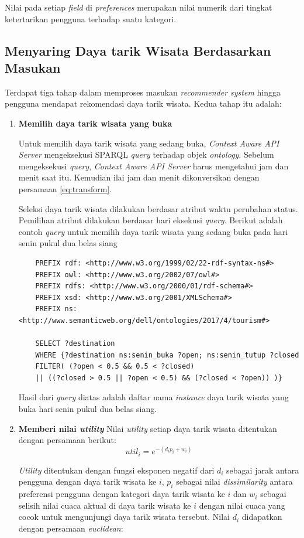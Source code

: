 Nilai pada setiap \textit{field} di \textit{preferences} merupakan nilai numerik dari tingkat ketertarikan pengguna terhadap suatu kategori.

\subsection{Menyaring Daya tarik Wisata Berdasarkan Masukan}
\par
Terdapat tiga tahap dalam memproses masukan \textit{recommender system} hingga pengguna mendapat rekomendasi daya tarik wisata. Kedua tahap itu adalah:
\begin{enumerate}
\item \textbf{Memilih daya tarik wisata yang buka}
\par
Untuk memilih daya tarik wisata yang sedang buka, \textit{Context Aware API Server} mengeksekusi SPARQL \textit{query} terhadap objek \textit{ontology}. Sebelum mengeksekusi
\textit{query}, \textit{Context Aware API Server} harus mengetahui jam dan menit saat itu. Kemudian ilai jam dan menit dikonversikan dengan persamaan \ref{eq:transform}.
\par
Seleksi daya tarik wisata dilakukan berdasar atribut waktu perubahan status. Pemilihan atribut dilakukan berdasar hari eksekusi \textit{query}. Berikut adalah contoh 
\textit{query} untuk memilih daya tarik wisata yang sedang buka pada hari senin pukul dua belas siang
\begin{verbatim}
	PREFIX rdf: <http://www.w3.org/1999/02/22-rdf-syntax-ns#>
	PREFIX owl: <http://www.w3.org/2002/07/owl#>
	PREFIX rdfs: <http://www.w3.org/2000/01/rdf-schema#>
	PREFIX xsd: <http://www.w3.org/2001/XMLSchema#>
	PREFIX ns: <http://www.semanticweb.org/dell/ontologies/2017/4/tourism#>
			
	SELECT ?destination 
	WHERE {?destination ns:senin_buka ?open; ns:senin_tutup ?closed 
	FILTER( (?open < 0.5 && 0.5 < ?closed)  
	|| ((?closed > 0.5 || ?open < 0.5) && (?closed < ?open)) )}
\end{verbatim}

Hasil dari \textit{query} diatas adalah daftar nama \textit{instance} daya tarik wisata yang buka hari senin pukul dua belas siang.
\item \textbf{Memberi nilai \textit{utility}}
Nilai \textit{utility} setiap daya tarik wisata ditentukan dengan persamaan berikut:
\begin{equation}
util_i = e^{-(d_i p_i + w_i)}
\label{eq:utility} 
\end{equation}
\par
\textit{Utility} ditentukan dengan fungsi eksponen negatif dari $d_i$ sebagai jarak antara pengguna dengan daya tarik wisata ke $i$, $p_i$ sebagai nilai 
\textit{dissimilarity} antara preferensi pengguna dengan kategori daya tarik wisata ke $i$ dan $w_i$ sebagai selisih nilai cuaca aktual di daya tarik wisata ke $i$ dengan
nilai cuaca yang cocok untuk mengunjungi daya tarik wisata tersebut. Nilai $d_i$ didapatkan dengan persamaan \textit{euclidean}:


\end{enumerate}

